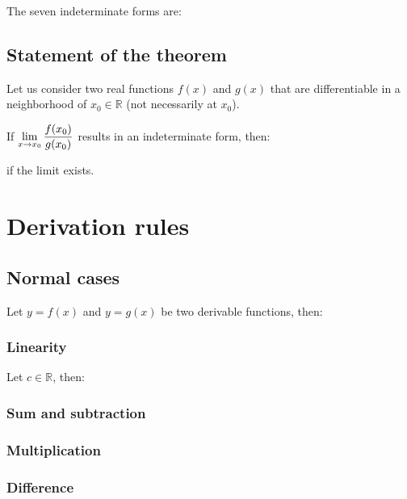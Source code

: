 \documentclass{article}
\begin{document}
The seven indeterminate forms are:

\newpage
\subsection{Statement of the theorem}
Let us consider two real functions $f(x)$ and $g(x)$ that are differentiable
in a neighborhood of $x_0\in\mathbb{R}$ (not necessarily at $x_0$).

If $\displaystyle \lim_{x \to x_0} \frac{f(x_0)}{g(x_0)}$ results in an indeterminate form, then:


if the limit exists.

\section{Derivation rules}
\subsection{Normal cases}
Let $y=f(x)$ and $y=g(x)$ be two derivable functions, then:

\subsubsection{Linearity}
Let $c \in \mathbb{R}$, then:

\subsubsection{Sum and subtraction}

\subsubsection{Multiplication}

\subsubsection{Difference}
\end{document}
